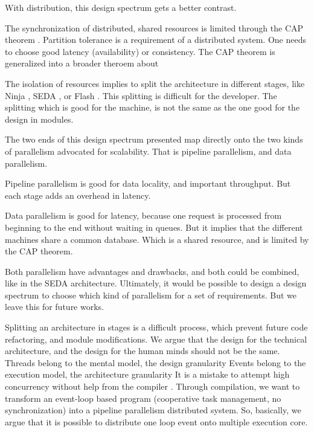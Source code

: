 With distribution, this design spectrum gets a better contrast. %

The synchronization of distributed, shared resources is limited through the CAP theorem  \cite{Gilbert2002a}. %
Partition tolerance is a requirement of a distributed system. %
One needs to choose good latency (availability) or consistency. %
The CAP theorem is generalized into a broader theroem about\cite{Gilbert2012} %

The isolation of resources implies to split the architecture in different stages, like Ninja \cite{Gribble2001}, SEDA \cite{Welsh2000}, or Flash \cite{Pai1999}.
This splitting is difficult for the developer.
The splitting which is good for the machine, is not the same as the one good for the design in modules.

The two ends of this design spectrum presented map directly onto the two kinds of parallelism advocated for scalability.
That is pipeline parallelism, and data parallelism.

Pipeline parallelism is good for data locality, and important throughput. %
But each stage adds an overhead in latency. %

Data parallelism is good for latency, because one request is processed from beginning to the end without waiting in queues.
But it implies that the different machines share a common database.
Which is a shared resource, and is limited by the CAP theorem.

Both parallelism have advantages and drawbacks, and both could be combined, like in the SEDA architecture. %
Ultimately, it would be possible to design a design spectrum to choose which kind of parallelism for a set of requirements.
But we leave this for future works.

Splitting an architecture in stages is a difficult process, which prevent future code refactoring, and module modifications.
We argue that the design for the technical architecture, and the design for the human minds should not be the same.
Threads belong to the mental model, the design granularity
Events belong to the execution model, the architecture granularity
  It is a mistake to attempt high concurrency without help from the compiler \cite{Behren2003}.
Through compilation, we want to transform an event-loop based program (cooperative task management, no synchronization) into a pipeline parallelism distributed system.
So, basically, we argue that it is possible to distribute one loop event onto multiple execution core.



